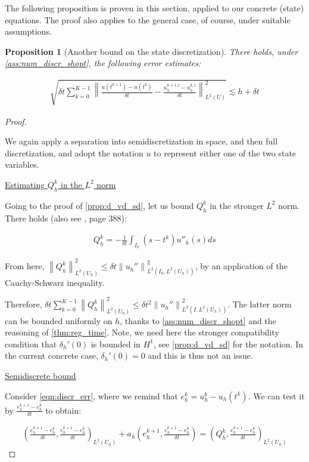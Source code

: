 \documentclass[english,a4paper,9pt,oneside]{scrbook}	%
\theoremstyle{break}
\newtheorem{prop}[equation]{Proposition}
\newenvironment{mproof}[1][\proofname]{%
  \begin{proof}[#1]$ $\par\nobreak\ignorespaces
}{%
  \end{proof}
}
\renewcommand*{\proofname}{Proof}
\theoremstyle{remark}
\newcommand{\ds}{\displaystyle}
\newcommand{\norm}[1]{\left\lVert#1\right\rVert}
\begin{document}
The following proposition is proven in this section, applied to our concrete (state) equations. The proof also applies to the general case, of course, under suitable assumptions.

\begin{prop}[Another bound on the state discretization]
\label{prop:another_bound}
There holds, under \cref{ass:num_discr_shopt}, the following error estimates:

\begin{align*}
	\sqrt{\delta t \sum_{k=0}^{K-1} \norm{\frac{u(t^{k+1})-u(t^k)}{\delta t} - \frac{u_h^{k+1,l}-u_h^{k, l}}{\delta t}}_{L^2(U)}^2}\lesssim h + \delta t
\end{align*}

\end{prop}

\begin{mproof}
We again apply a separation into semidiscretization in space, and then full discretization, and adopt the notation $u$ to represent either one of the two state variables.

\underline{Estimating $Q_h^k$ in the $L^2$ norm}

Going to the proof of \cref{prop:d_vd_sd}, let us bound $Q_h^k$ in the stronger $L^2$ norm. There holds (also see \cite{quarteroni}, page 388):

\begin{align*}
	Q_h^k = -\frac{1}{\delta t}\int_{I_k}(s-t^k)u''_h(s)ds
\end{align*}

From here, $\norm{Q_h^k}_{L^2(U_h)}^2\leq \delta t \norm{u_h''}_{L^2(I_k,{L^2(U_h)})}^2$, by an application of the Cauchy-Schwarz inequality. 

Therefore, $\delta t \sum_{k=0}^{K-1} \norm{Q_h^k}_{L^2(U_h)}^2\leq \delta t^2 \norm{u_h''}_{L^2(I,{L^2(U_h)})}^2$. The latter norm can be bounded uniformly on $h$, thanks to \cref{ass:num_discr_shopt} and the reasoning of \cref{thm:reg_time}. Note, we need here the stronger compatibility condition that $\delta_h'(0)$ is bounded in $H^1$, see \cref{prop:d_vd_sd} for the notation. In the current concrete case, $\delta_h'(0) = 0$ and this is thus not an issue.

\underline{Semidiscrete bound}

Consider \cref{eqn:discr_err}, where we remind that $e_h^k = u_h^k-u_h(t^k)$. We can test it by $\ds \frac{e_h^{k+1}-e_h^k}{\delta t}$ to obtain:

\begin{align*}
\left ( \frac{e_{h}^{k+1}-e_h^k}{\delta t}, \frac{e_{h}^{k+1}-e_h^k}{\delta t}\right)_{L^2(U_h)} + a_h \left (e_h^{k+1}, \frac{e_{h}^{k+1}-e_h^k}{\delta t} \right ) = \left ( Q_h^k,\frac{e_{h}^{k+1}-e_h^k}{\delta t}\right)_{L^2(U_h)}
\end{align*}


\end{mproof}
\end{document}
